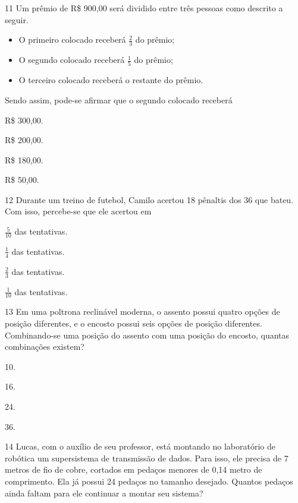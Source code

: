 \num{11} Um prêmio de R\$ 900,00 será dividido entre três pessoas como descrito a seguir.

\begin{itemize}
\item
  O primeiro colocado receberá $\frac{2}{3}$ do prêmio;
\item
  O segundo colocado receberá $\frac{1}{5}$ do prêmio;
\item
  O terceiro colocado receberá o restante do prêmio.
\end{itemize}

Sendo assim, pode-se afirmar que o segundo colocado receberá

\begin{escolha}
\item
  R\$ 300,00.
\item
  R\$ 200,00.
\item
  R\$ 180,00.
\item
  R\$ 50,00.
\end{escolha}


\num{12} Durante um treino de futebol, Camilo acertou 18 pênaltis dos 36 que
bateu. Com isso, percebe-se que ele acertou em

\begin{escolha}
\item
  $\frac{5}{10}$ das tentativas.
\item
  $\frac{1}{4}$ das tentativas.
\item
  $\frac{2}{3}$ das tentativas.
\item
  $\frac{1}{10}$ das tentativas.
\end{escolha}


\num{13} Em uma poltrona reclinável moderna, o assento possui quatro opções de posição
diferentes, e o encosto possui seis opções de posição diferentes. Combinando-se uma posição do assento com uma posição do encosto, quantas combinações existem?

\begin{escolha}
\item
  10.
\item
  16.
\item
  24.
\item
  36.
\end{escolha}


\num{14} Lucas, com o auxílio de seu professor, está montando no laboratório de
robótica um supersistema de transmissão de dados. Para isso, ele
precisa de 7 metros de fio de cobre, cortados em pedaços menores de 0,14
metro de comprimento. Ela já possui 24 pedaços no tamanho desejado. Quantos pedaços ainda
faltam para ele continuar a montar seu sistema?

